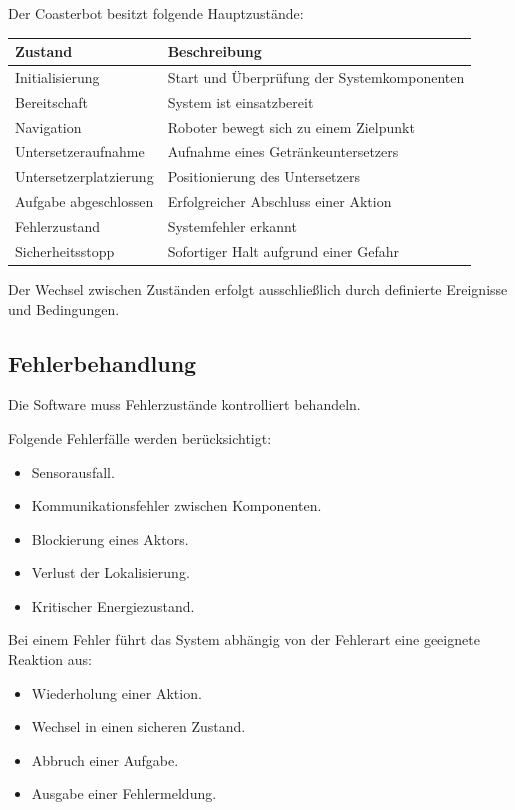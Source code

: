 \documentclass[
  a4paper,
  12pt,
  DIV=12,        %
  parskip=half,  %
  headings=small %
]{scrartcl}
\theoremstyle{definition}
\providecommand{\tightlist}{%
  \setlength{\itemsep}{0pt}\setlength{\parskip}{0pt}}
\theoremstyle{definition}
\begin{document}
Der Coasterbot besitzt folgende Hauptzustände:

\begin{longtable}[]{@{}ll@{}}
\toprule\noalign{}
Zustand & Beschreibung \\
\midrule\noalign{}
\endhead
\bottomrule\noalign{}
\endlastfoot
Initialisierung & Start und Überprüfung der Systemkomponenten \\
Bereitschaft & System ist einsatzbereit \\
Navigation & Roboter bewegt sich zu einem Zielpunkt \\
Untersetzeraufnahme & Aufnahme eines Getränkeuntersetzers \\
Untersetzerplatzierung & Positionierung des Untersetzers \\
Aufgabe abgeschlossen & Erfolgreicher Abschluss einer Aktion \\
Fehlerzustand & Systemfehler erkannt \\
Sicherheitsstopp & Sofortiger Halt aufgrund einer Gefahr \\
\end{longtable}

Der Wechsel zwischen Zuständen erfolgt ausschließlich durch definierte
Ereignisse und Bedingungen.

\subsection{Fehlerbehandlung}\label{fehlerbehandlung}

Die Software muss Fehlerzustände kontrolliert behandeln.

Folgende Fehlerfälle werden berücksichtigt:

\begin{itemize}
\tightlist
\item
  Sensorausfall.
\item
  Kommunikationsfehler zwischen Komponenten.
\item
  Blockierung eines Aktors.
\item
  Verlust der Lokalisierung.
\item
  Kritischer Energiezustand.
\end{itemize}

Bei einem Fehler führt das System abhängig von der Fehlerart eine
geeignete Reaktion aus:

\begin{itemize}
\tightlist
\item
  Wiederholung einer Aktion.
\item
  Wechsel in einen sicheren Zustand.
\item
  Abbruch einer Aufgabe.
\item
  Ausgabe einer Fehlermeldung.
\end{itemize}
\end{document}
